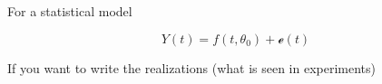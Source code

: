 \documentclass{article}
\begin{document}

For a statistical model

\begin{equation}
Y(t) = f(t,\theta_0) + \mathscr{e}(t)
\end{equation}

If you want to write the realizations (what is seen in experiments)

\end{document}
